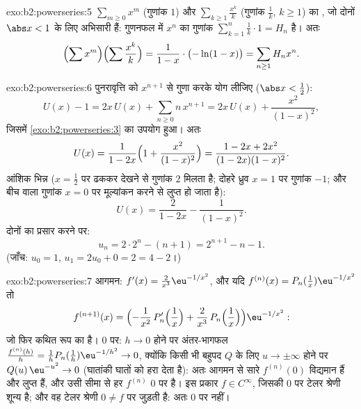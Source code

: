\begin{solution}{exo:b2:powerseries:5}
$\sum_{m \geq 0} x^m$ (गुणांक $1$) और $\sum_{k\geq1} \frac{x^k}{k}$ (गुणांक $\frac1k$, $k \geq
1$) का , जो दोनों $\abs x < 1$
के लिए  अभिसारी हैं: गुणनफल में $x^n$ का गुणांक $\sum_{k=1}^{n} \frac1k \cdot 1 = H_n$ है। अतः
\[
\Bigl(\sum x^m\Bigr)\Bigl(\sum \frac{x^k}{k}\Bigr)
= \frac{1}{1-x}\cdot\bigl(-\ln(1-x)\bigr)
= \sum_{n\geq1} H_n x^n .
\]
\end{solution}

\begin{solution}{exo:b2:powerseries:6}
पुनरावृत्ति को $x^{n+1}$ से गुणा करके योग लीजिए ($\abs x <
\frac12$):
\[
U(x) - 1 = 2x\,U(x) + \sum_{n\geq0} n\,x^{n+1}
= 2x\,U(x) + \frac{x^2}{(1-x)^2} ,
\]
जिसमें \cref{exo:b2:powerseries:3} का उपयोग हुआ। अतः
\[
U(x) = \frac{1}{1 - 2x}\Bigl(1 + \frac{x^2}{(1-x)^2}\Bigr)
= \frac{1 - 2x + 2x^2}{(1-2x)(1-x)^2} .
\]
आंशिक भिन्न ($x = \frac12$ पर ढककर देखने से गुणांक $2$ मिलता है; दोहरे ध्रुव $x = 1$
पर गुणांक $-1$; और बीच वाला गुणांक $x = 0$ पर मूल्यांकन करने से लुप्त हो जाता
है):
\[
U(x) = \frac{2}{1-2x} - \frac{1}{(1 - x)^2} .
\]
दोनों का प्रसार करने पर:
\[
u_n = 2\cdot 2^n - (n + 1) = 2^{n+1} - n - 1 .
\]
(जाँच: $u_0 = 1$, $u_1 = 2u_0 + 0 = 2 = 4 - 2$।)
\end{solution}

\begin{solution}{exo:b2:powerseries:7}
आगमन: $f'(x) = \frac{2}{x^3}\eu^{-1/x^2}$, और यदि $f^{(n)}(x)
= P_n(\tfrac1x)\eu^{-1/x^2}$ तो
\[
f^{(n+1)}(x) =
\Bigl(-\frac{1}{x^2}\,P_n'\Bigl(\frac1x\Bigr) +
\frac{2}{x^3}\,P_n\Bigl(\frac1x\Bigr)\Bigr)\eu^{-1/x^2} :
\]
जो फिर कथित रूप का है। $0$ पर: $h \to 0$ होने पर अंतर-भागफल $\frac{f^{(n)}(h)}{h} =
\frac1h P_n(\frac1h)\eu^{-1/h^2} \to 0$, क्योंकि किसी
भी बहुपद $Q$ के लिए $u \to \pm\infty$ होने पर $Q(u)\,\eu^{-u^2} \to 0$ (घातांकी घातों को हरा देता है): अतः
आगमन से सारे $f^{(n)}(0)$ विद्यमान हैं और लुप्त हैं, और उसी सीमा से हर $f^{(n)}$ $0$
पर  है। इस प्रकार $f \in C^\infty$, जिसकी $0$ पर टेलर श्रेणी शून्य है; और वह
टेलर श्रेणी $0 \neq f$ पर जुड़ती है: अतः $0$ पर  नहीं।
\end{solution}


